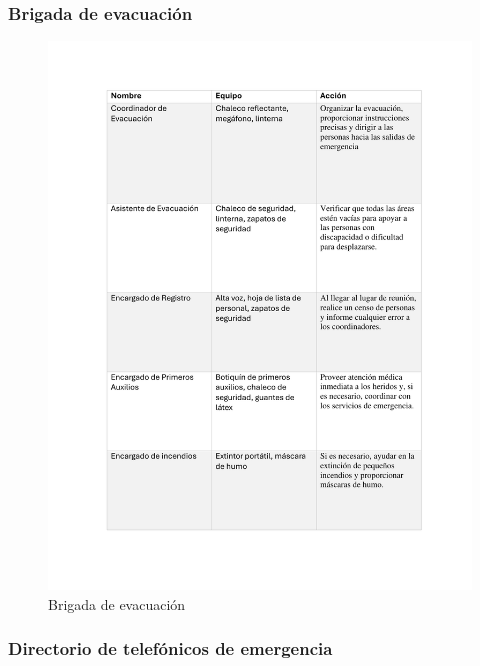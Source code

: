     \subsubsection{Brigada de evacuación}
    \begin{figure}[H]
        \centering
        \includegraphics[scale=0.4]{13/img/brigada.pdf}
        \caption{Brigada de evacuación}
    \end{figure}
    \subsubsection{Directorio de telefónicos de emergencia}
    
